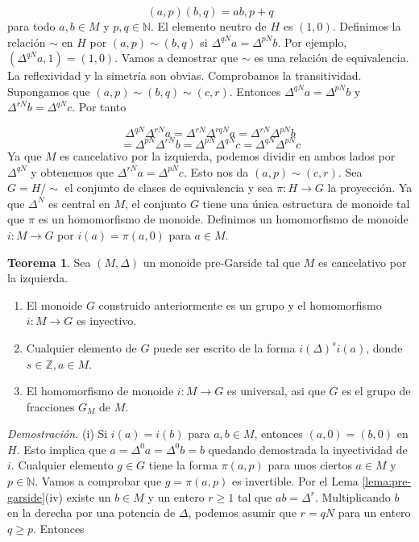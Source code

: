 \documentclass[12pt]{article}
\theoremstyle{definition}
\newtheorem{teor}{Teorema}[section]
\begin{document}
$$(a,p)(b,q)=ab,p+q$$
\newline
para todo $a,b\in M$ y $p,q\in\mathbb{N}$. El elemento neutro de $H$ es $(1,0)$.
\newline
\newline
Definimos la relación $\sim$ en $H$ por $(a,p)\sim(b,q)$ si $\Delta^{qN}a=\Delta^{pN}b$. Por ejemplo, $(\Delta^{qN}a,1)=(1,0)$. Vamos a demostrar que $\sim$ es una relación de equivalencia. La reflexividad y la simetría son obvias. Comprobamos la transitividad. Supongamos que $(a,p)\sim(b,q)\sim(c,r)$. Entonces $\Delta^{qN}a=\Delta^{pN}b$ y $\Delta^{rN}b=\Delta^{qN}c$. Por tanto

$$\Delta^{qN}\Delta^{rN}a=\Delta^{rN}\Delta^{rqN}a=\Delta^{rN}\Delta^{pN}b$$
$$=\Delta^{pN}\Delta^{rN}b=\Delta^{pN}\Delta^{qN}c=\Delta^{qN}\Delta^{pN}c$$
\newline
Ya que $M$ es cancelativo por la izquierda, podemos dividir en ambos lados por $\Delta^{qN}$ y obtenemos que $\Delta^{rN}a=\Delta^{pN}c$. Esto nos da $(a,p)\sim(c,r)$.
\newline
\newline
Sea $G=H/\sim$ el conjunto de clases de equivalencia y sea $\pi:H\rightarrow G$ la proyección. Ya que $\Delta^N$ es central en $M$, el conjunto $G$ tiene una única estructura de monoide tal que $\pi$ es un homomorfismo de monoide. Definimos un homomorfismo de monoide $i:M\rightarrow G$ por $i(a)=\pi(a,0)$ para $a\in M$.

\begin{teor}
Sea $(M,\Delta)$ un monoide pre-Garside tal que $M$ es cancelativo por la izquierda.
\begin{enumerate}[label=(\roman*).]
\item El monoide $G$ construido anteriormente es un grupo y el homomorfismo $i:M\rightarrow G$ es inyectivo.
\item Cualquier elemento de $G$ puede ser escrito de la forma $i(\Delta)^si(a)$, donde $s\in\mathbb{Z}, a\in M$.
\item El homomorfismo de monoide $i:M\rightarrow G$ es universal, asi que $G$ es el grupo de fracciones $G_M$ de $M$.
\end{enumerate}
\label{teor:pre-garside}
\end{teor}

\textit{Demostración.} (i) Si $i(a)=i(b)$ para $a,b\in M$, entonces $(a,0)=(b,0)$ en $H$. Esto implica que $a=\Delta^0a=\Delta^0b=b$ quedando demostrada la inyectividad de $i$.
\newline
\newline
Cualquier elemento $g\in G$ tiene la forma $\pi(a,p)$ para unos ciertos $a\in M$ y $p\in\mathbb{N}$. Vamos a comprobar que $g=\pi(a,p)$ es invertible. Por el Lema \ref{lema:pre-garside}(iv) existe un $b\in M$ y un entero $r\geq 1$ tal que $ab=\Delta^r$. Multiplicando $b$ en la derecha por una potencia de $\Delta$, podemos asumir que $r=qN$ para un entero $q\geq p$. Entonces
\end{document}
